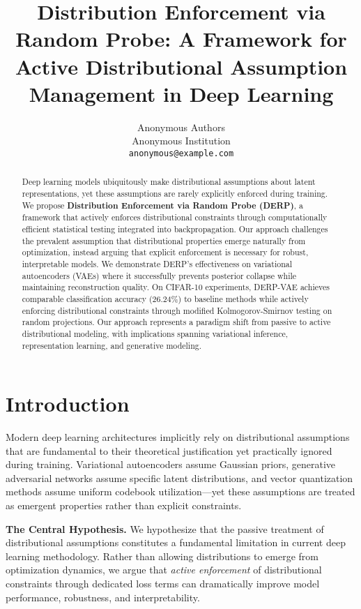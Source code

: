 \documentclass{article}
\title{Distribution Enforcement via Random Probe: A Framework for Active Distributional Assumption Management in Deep Learning}
\author{%
  Anonymous Authors\\
  Anonymous Institution\\
  \texttt{anonymous@example.com}
}
\begin{document}
\maketitle

\begin{abstract}
Deep learning models ubiquitously make distributional assumptions about latent representations, yet these assumptions are rarely explicitly enforced during training. We propose \textbf{Distribution Enforcement via Random Probe (DERP)}, a framework that actively enforces distributional constraints through computationally efficient statistical testing integrated into backpropagation. Our approach challenges the prevalent assumption that distributional properties emerge naturally from optimization, instead arguing that explicit enforcement is necessary for robust, interpretable models. We demonstrate DERP's effectiveness on variational autoencoders (VAEs) where it successfully prevents posterior collapse while maintaining reconstruction quality. On CIFAR-10 experiments, DERP-VAE achieves comparable classification accuracy (26.24\%) to baseline methods while actively enforcing distributional constraints through modified Kolmogorov-Smirnov testing on random projections. Our approach represents a paradigm shift from passive to active distributional modeling, with implications spanning variational inference, representation learning, and generative modeling.
\end{abstract}

\section{Introduction}

Modern deep learning architectures implicitly rely on distributional assumptions that are fundamental to their theoretical justification yet practically ignored during training. Variational autoencoders assume Gaussian priors, generative adversarial networks assume specific latent distributions, and vector quantization methods assume uniform codebook utilization—yet these assumptions are treated as emergent properties rather than explicit constraints.

\textbf{The Central Hypothesis.} We hypothesize that the passive treatment of distributional assumptions constitutes a fundamental limitation in current deep learning methodology. Rather than allowing distributions to emerge from optimization dynamics, we argue that \emph{active enforcement} of distributional constraints through dedicated loss terms can dramatically improve model performance, robustness, and interpretability.
\end{document}
